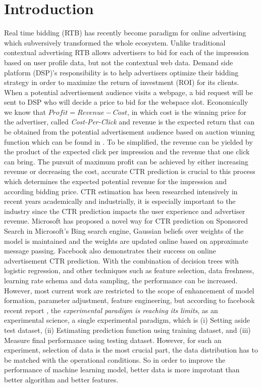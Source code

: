 \documentclass{sig-alternate}
\begin{document}

\section{Introduction}
Real time bidding (RTB) has recently become paradigm for online advertising which subversively transformed the whole ecosystem. Unlike traditional contextual advertising
RTB allows advertisers to bid for each of the impression based on user profile data, but not the contextual web data. Demand side platform (DSP)'s responsibility is to help advertisers optimize their bidding strategy in order to maximize the return of investment (ROI) for its clients. When a potential advertisement audience visits a webpage, a bid request will be sent to DSP who will decide a price to bid for the webspace slot. Economically we know that \(Profit = Revenue - Cost\), in which cost is the winning price for the advertiser, called \textit{Cost-Per-Click} and revenue is the expected return that can be obtained from the potential advertisement audience based on auction winning function which can be found in \cite{zhang2014optimal}. To be simplified, the revenue can be yielded by the product of the expected click per impression and the revenue that one click can bring. The pursuit of maximum profit can be achieved by either increasing revenue or decreasing the cost, accurate CTR prediction is crucial to this process which determines the expected potential revenue for the impression and according bidding price. 
CTR estimation has been researched intensively in recent years academically and industrially, it is especially important to the industry since the CTR prediction impacts the user experience and advertiser revenue. Microsoft \cite{graepel2010web}has proposed a novel way for CTR prediction on Sponsored Search in Microsoft’s Bing search engine, Gaussian beliefs over weights of the model is maintained and the weights are updated online based on approximate message passing. Facebook \cite{he2014practical} also demonstrates their success on online advertisement CTR prediction. With the combination of decision trees with logistic regression, and other techniques such as feature selection, data freshness, learning rate schema and data sampling, the performance can be increased. However, most current work are restricted to the scope of enhancement of model formation, parameter adjustment, feature engineering, but according to facebook recent report \cite{facebook2015}, the \textit{experimental paradigm is reaching its limits}, as an experimental science, a single experimental paradigm, which is (i) Setting aside test dataset, (ii) Estimating prediction function using training dataset, and (iii) Measure final performance using testing dataset. However, for such an experiment, selection of data is the most crucial part, the data distribution has to be matched with the operational conditions. So in order to improve the performance of machine learning model, better data is more improtant than better algorithm and better features.
\end{document}
